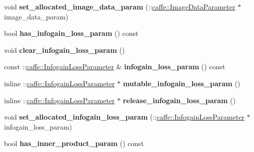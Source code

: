 \begin{DoxyCompactItemize}
void {\bfseries set\+\_\+allocated\+\_\+image\+\_\+data\+\_\+param} (\+::\mbox{\hyperlink{classcaffe_1_1_image_data_parameter}{caffe\+::\+Image\+Data\+Parameter}} $\ast$image\+\_\+data\+\_\+param)
\item 
\mbox{\label{classcaffe_1_1_v1_layer_parameter_a239d162fe69ba3ac950f6c978ad8c81c}} 
bool {\bfseries has\+\_\+infogain\+\_\+loss\+\_\+param} () const
\item 
\mbox{\label{classcaffe_1_1_v1_layer_parameter_a340e31f9c696d7924e20751f419858b9}} 
void {\bfseries clear\+\_\+infogain\+\_\+loss\+\_\+param} ()
\item 
\mbox{\label{classcaffe_1_1_v1_layer_parameter_ab8f1021f361583867aced60b8afc5c37}} 
const \+::\mbox{\hyperlink{classcaffe_1_1_infogain_loss_parameter}{caffe\+::\+Infogain\+Loss\+Parameter}} \& {\bfseries infogain\+\_\+loss\+\_\+param} () const
\item 
\mbox{\label{classcaffe_1_1_v1_layer_parameter_aac4288021fd03a6471eb6ae8bae70f8a}} 
inline \+::\mbox{\hyperlink{classcaffe_1_1_infogain_loss_parameter}{caffe\+::\+Infogain\+Loss\+Parameter}} $\ast$ {\bfseries mutable\+\_\+infogain\+\_\+loss\+\_\+param} ()
\item 
\mbox{\label{classcaffe_1_1_v1_layer_parameter_af8177d97182e093d44998491b8714bf8}} 
inline \+::\mbox{\hyperlink{classcaffe_1_1_infogain_loss_parameter}{caffe\+::\+Infogain\+Loss\+Parameter}} $\ast$ {\bfseries release\+\_\+infogain\+\_\+loss\+\_\+param} ()
\item 
\mbox{\label{classcaffe_1_1_v1_layer_parameter_aae9faaacd77f11400f9e679c26b45770}} 
void {\bfseries set\+\_\+allocated\+\_\+infogain\+\_\+loss\+\_\+param} (\+::\mbox{\hyperlink{classcaffe_1_1_infogain_loss_parameter}{caffe\+::\+Infogain\+Loss\+Parameter}} $\ast$infogain\+\_\+loss\+\_\+param)
\item 
\mbox{\label{classcaffe_1_1_v1_layer_parameter_ad2ef494ac58bfb9c252d4fceaf4ef51c}} 
bool {\bfseries has\+\_\+inner\+\_\+product\+\_\+param} () const
\item 

\end{DoxyCompactItemize}
